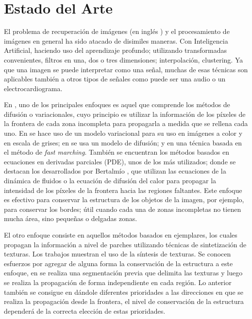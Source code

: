 \section*{Estado del Arte}

El problema de recuperaci\'on de im\'agenes (en ingl\'es \II) y el procesamiento de imágenes en general ha sido atacado de disimiles maneras. Con Inteligencia Artificial, haciendo uso del aprendizaje profundo; utilizando transformadas convenientes, filtros en una, dos o tres dimensiones; interpolaci\'on, clustering. Ya que una imagen se puede interpretar como una señal, muchas de esas t\'ecnicas son aplicables tambi\'en a otros tipos de señales como puede ser una audio o un electrocardiograma.

En \II, uno de los principales enfoques es aquel que comprende los m\'etodos de difusión o variacionales, cuyo principio es utilizar la informaci\'on de los p\'ixeles de la frontera de cada zona incompleta para propagarla a medida que se rellena cada uno. En \cite{ballester2001variational} se hace uso de un modelo variacional para su uso en im\'agenes a color y en escala de grises; en \cite{chan2001nontexture} se usa un modelo de difusión; y en \cite{telea2004image} una t\'ecnica basada en el m\'etodo de \textit{fast marching}. También se encuentran los métodos basados en ecuaciones en derivadas parciales (PDE), unos de los m\'as utilizados; donde se destacan los desarrollados por Bertalmío \cite{bertalmio2001navier,bertalmio2000image}, que utilizan las ecuaciones de la dinámica de fluidos o la ecuación de difusión del calor para propagar la intensidad de los píxeles de la frontera hacia las regiones faltantes. Este enfoque es efectivo para conservar la estructura de los objetos de la imagen, por ejemplo, para conservar los bordes; \'util cuando cada una de zonas incompletas no tienen mucha área, sino pequeñas o delgadas zonas.

El otro enfoque consiste en aquellos m\'etodos basados en ejemplares, los cuales propagan la informaci\'on a nivel de parches utilizando t\'ecnicas de sintetizaci\'on de texturas. Los trabajos \cite{ashikhmin2001synthesizing,garber1981computational,liang2001real} muestran el uso de la s\'intesis de texturas. Se conocen esfuerzos por agregar de alguna forma la conservaci\'on de la estructura a este enfoque, en \cite{li2014image} se realiza una segmentaci\'on previa que delimita las texturas y luego se realiza la propagaci\'on de forma independiente en cada regi\'on. Lo anterior tambi\'en se consigue en \cite{criminisi2003object, wang2011image} d\'andole diferentes prioridades a las direcciones en que se realiza la propagaci\'on desde la frontera, el nivel de conservaci\'on de la estructura depender\'a de la correcta elecci\'on de estas prioridades.

